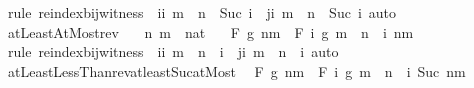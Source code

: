 \begin{isabellebody}
\ {\isacharparenleft}{\kern0pt}rule\ reindex{\isacharunderscore}{\kern0pt}bij{\isacharunderscore}{\kern0pt}witness\ {\isacharbrackleft}{\kern0pt}\ i{\isacharequal}{\kern0pt}{\isachardoublequoteopen}{\isasymlambda}i{\isachardot}{\kern0pt}\ m\ {\isacharplus}{\kern0pt}\ n\ {\isacharminus}{\kern0pt}\ Suc\ i{\isachardoublequoteclose}\ \ j{\isacharequal}{\kern0pt}{\isachardoublequoteopen}{\isasymlambda}i{\isachardot}{\kern0pt}\ m\ {\isacharplus}{\kern0pt}\ n\ {\isacharminus}{\kern0pt}\ Suc\ i{\isachardoublequoteclose}{\isacharbrackright}{\kern0pt}{\isacharcomma}{\kern0pt}\ auto{\isacharparenright}{\kern0pt}%
\endisatagproof
{\isafoldproof}%
%
\isadelimproof
\isanewline
%
\endisadelimproof
\isanewline
{}\isamarkupfalse%
\ atLeastAtMost{\isacharunderscore}{\kern0pt}rev{\isacharcolon}{\kern0pt}\isanewline
\ \ \ n\ m\ {\isacharcolon}{\kern0pt}{\isacharcolon}{\kern0pt}\ nat\isanewline
\ \ \ {\isachardoublequoteopen}F\ g\ {\isacharbraceleft}{\kern0pt}n{\isachardot}{\kern0pt}{\isachardot}{\kern0pt}m{\isacharbraceright}{\kern0pt}\ {\isacharequal}{\kern0pt}\ F\ {\isacharparenleft}{\kern0pt}{\isasymlambda}i{\isachardot}{\kern0pt}\ g\ {\isacharparenleft}{\kern0pt}m\ {\isacharplus}{\kern0pt}\ n\ {\isacharminus}{\kern0pt}\ i{\isacharparenright}{\kern0pt}{\isacharparenright}{\kern0pt}\ {\isacharbraceleft}{\kern0pt}n{\isachardot}{\kern0pt}{\isachardot}{\kern0pt}m{\isacharbraceright}{\kern0pt}{\isachardoublequoteclose}\isanewline
%
\isadelimproof
\ \ %
\endisadelimproof
%
\isatagproof
{}\isamarkupfalse%
\ {\isacharparenleft}{\kern0pt}rule\ reindex{\isacharunderscore}{\kern0pt}bij{\isacharunderscore}{\kern0pt}witness\ {\isacharbrackleft}{\kern0pt}\ i{\isacharequal}{\kern0pt}{\isachardoublequoteopen}{\isasymlambda}i{\isachardot}{\kern0pt}\ m\ {\isacharplus}{\kern0pt}\ n\ {\isacharminus}{\kern0pt}\ i{\isachardoublequoteclose}\ \ j{\isacharequal}{\kern0pt}{\isachardoublequoteopen}{\isasymlambda}i{\isachardot}{\kern0pt}\ m\ {\isacharplus}{\kern0pt}\ n\ {\isacharminus}{\kern0pt}\ i{\isachardoublequoteclose}{\isacharbrackright}{\kern0pt}{\isacharparenright}{\kern0pt}\ auto%
\endisatagproof
{\isafoldproof}%
%
\isadelimproof
\isanewline
%
\endisadelimproof
\isanewline
{}\isamarkupfalse%
\ atLeastLessThan{\isacharunderscore}{\kern0pt}rev{\isacharunderscore}{\kern0pt}at{\isacharunderscore}{\kern0pt}least{\isacharunderscore}{\kern0pt}Suc{\isacharunderscore}{\kern0pt}atMost{\isacharcolon}{\kern0pt}\isanewline
\ \ {\isachardoublequoteopen}F\ g\ {\isacharbraceleft}{\kern0pt}n{\isachardot}{\kern0pt}{\isachardot}{\kern0pt}{\isacharless}{\kern0pt}m{\isacharbraceright}{\kern0pt}\ {\isacharequal}{\kern0pt}\ F\ {\isacharparenleft}{\kern0pt}{\isasymlambda}i{\isachardot}{\kern0pt}\ g\ {\isacharparenleft}{\kern0pt}m\ {\isacharplus}{\kern0pt}\ n\ {\isacharminus}{\kern0pt}\ i{\isacharparenright}{\kern0pt}{\isacharparenright}{\kern0pt}\ {\isacharbraceleft}{\kern0pt}Suc\ n{\isachardot}{\kern0pt}{\isachardot}{\kern0pt}m{\isacharbraceright}{\kern0pt}{\isachardoublequoteclose}\isanewline

\end{isabellebody}
